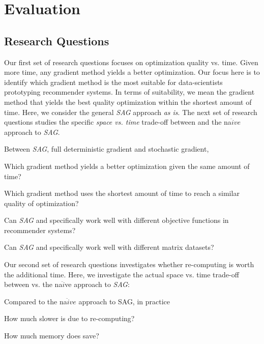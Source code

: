 \section{Evaluation}


\subsection{Research Questions}

Our first set of research questions focuses on optimization quality vs. time.
Given more time, any gradient method yields a better optimization.  
Our focus here is to identify which gradient method is the most suitable for data-scientists prototyping recommender systems.
In terms of suitability, we mean the gradient method that yields the best quality optimization within the shortest amount of time.
Here, we consider the general \emph{SAG} approach \emph{as is}. 
The next set of research questions studies the specific \emph{space vs. time} trade-off between \tool and the na$\ddot{i}ve$ approach to \emph{SAG}.

Between \emph{SAG}, full deterministic gradient and stochastic gradient,
\begin{sloppy}
\begin{compactenum}
\item Which gradient method yields a better optimization given the same amount of time?
\item Which gradient method uses the shortest amount of time to reach a similar quality of optimization?
\item Can \emph{SAG} and specifically \tool work well with different objective functions in recommender systems?
\item Can \emph{SAG} and specifically \tool work well with different matrix datasets?
\end{compactenum}
\end{sloppy}


Our second set of research questions investigates whether re-computing is worth the additional time.
Here, we investigate the actual space vs. time trade-off between \tool vs. the na$\ddot{i}$ve approach to \emph{SAG}:

Compared to the na$\ddot{i}ve$ approach to SAG, in practice
\begin{sloppy}
\begin{compactenum}
\setcounter{enumi}{4}
\item How much slower is \tool due to re-computing?
\item How much memory does \tool save?
\end{compactenum}
\end{sloppy}



